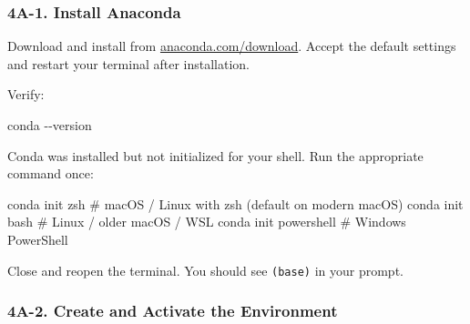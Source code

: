 \documentclass[
  letterpaper,
  DIV=11,
  numbers=noendperiod]{scrreprt}
\newenvironment{Shaded}{\begin{snugshade}}{\end{snugshade}}
\newcommand{\AttributeTok}[1]{\textcolor[rgb]{0.40,0.45,0.13}{#1}}
\newcommand{\CommentTok}[1]{\textcolor[rgb]{0.37,0.37,0.37}{#1}}
\newcommand{\ExtensionTok}[1]{\textcolor[rgb]{0.00,0.23,0.31}{#1}}
\newcommand{\NormalTok}[1]{\textcolor[rgb]{0.00,0.23,0.31}{#1}}
\begin{document}
\subsubsection{4A-1. Install Anaconda}\label{a-1.-install-anaconda}

Download and install from
\href{https://www.anaconda.com/download}{anaconda.com/download}. Accept
the default settings and restart your terminal after installation.

Verify:

\begin{Shaded}
\begin{Highlighting}[]
\ExtensionTok{conda} \AttributeTok{{-}{-}version}
\end{Highlighting}
\end{Shaded}

\begin{tcolorbox}[enhanced jigsaw, arc=.35mm, bottomrule=.15mm, bottomtitle=1mm, breakable, colback=white, colbacktitle=quarto-callout-tip-color!10!white, colframe=quarto-callout-tip-color-frame, coltitle=black, left=2mm, leftrule=.75mm, opacityback=0, opacitybacktitle=0.6, rightrule=.15mm, title=\textcolor{quarto-callout-tip-color}{\faLightbulb}\hspace{0.5em}{\texttt{conda:\ command\ not\ found} after install?}, titlerule=0mm, toprule=.15mm, toptitle=1mm]

Conda was installed but not initialized for your shell. Run the
appropriate command once:

\begin{Shaded}
\begin{Highlighting}[]
\ExtensionTok{conda}\NormalTok{ init zsh        }\CommentTok{\# macOS / Linux with zsh (default on modern macOS)}
\ExtensionTok{conda}\NormalTok{ init bash       }\CommentTok{\# Linux / older macOS / WSL}
\ExtensionTok{conda}\NormalTok{ init powershell }\CommentTok{\# Windows PowerShell}
\end{Highlighting}
\end{Shaded}

Close and reopen the terminal. You should see \texttt{(base)} in your
prompt.

\end{tcolorbox}

\subsubsection{4A-2. Create and Activate the
Environment}\label{a-2.-create-and-activate-the-environment}
\end{document}
